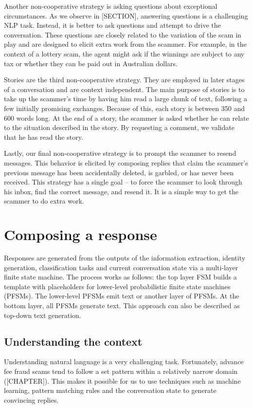 Another non-cooperative strategy is asking questions about exceptional circumstances. As we observe in [SECTION], answering questions is a challenging NLP task. Instead, it is better to ask questions and attempt to drive the conversation. These questions are closely related to the variation of the scam in play and are designed to elicit extra work from the scammer. For example, in the context of a lottery scam, the agent might ask if the winnings are subject to any tax or whether they can be paid out in Australian dollars.

Stories are the third non-cooperative strategy. They are employed in later stages of a conversation and are context independent. The main purpose of stories is to take up the scammer's time by having him read a large chunk of text, following a few initially promising exchanges. Because of this, each story is between 350 and 600 words long. At the end of a story, the scammer is asked whether he can relate to the situation described in the story. By requesting a comment, we validate that he has read the story.

Lastly, our final non-cooperative strategy is to prompt the scammer to resend messages. This behavior is elicited by composing replies that claim the scammer's previous message has been accidentally deleted, is garbled, or has never been received. This strategy has a single goal -- to force the scammer to look through his inbox, find the correct message, and resend it. It is a simple way to get the scammer to do extra work.

\section{Composing a response}
Responses are generated from the outputs of the information extraction, identity generation, classification tasks and current conversation state via a multi-layer finite state machine. The process works as follows: the top layer FSM builds a template with placeholders for lower-level probabilistic finite state machines (PFSMs). The lower-level PFSMs emit text or another layer of PFSMs. At the bottom layer, all PFSMs generate text. This approach can also be described as top-down text generation.

\subsection{Understanding the context}
Understanding natural language is a very challenging task. Fortunately, advance fee fraud scams tend to follow a set pattern within a relatively narrow domain ([CHAPTER]). This makes it possible for us to use techniques such as machine learning, pattern matching rules and the conversation state to generate convincing replies.

